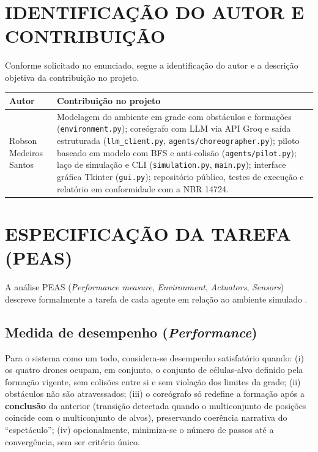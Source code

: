 \documentclass[12pt,a4paper,oneside]{article}
\begin{document}
\section{IDENTIFICAÇÃO DO AUTOR E CONTRIBUIÇÃO}

Conforme solicitado no enunciado, segue a identificação do autor e a descrição objetiva da contribuição no projeto.

\begin{table}[h]
\centering
\small
\begin{tabular}{p{4.2cm}p{9.5cm}}
\toprule
\textbf{Autor} & \textbf{Contribuição no projeto} \\
\midrule
Robson Medeiros Santos & Modelagem do ambiente em grade com obstáculos e formações (\texttt{environment.py}); coreógrafo com LLM via API Groq e saída estruturada (\texttt{llm\_client.py}, \texttt{agents/choreographer.py}); piloto baseado em modelo com BFS e anti-colisão (\texttt{agents/pilot.py}); laço de simulação e CLI (\texttt{simulation.py}, \texttt{main.py}); interface gráfica Tkinter (\texttt{gui.py}); repositório público, testes de execução e relatório em conformidade com a NBR 14724. \\
\bottomrule
\end{tabular}
\end{table}

\section{ESPECIFICAÇÃO DA TAREFA (PEAS)}

A análise PEAS (\textit{Performance measure}, \textit{Environment}, \textit{Actuators}, \textit{Sensors}) descreve formalmente a tarefa de cada agente em relação ao ambiente simulado \cite{russell2021}.

\subsection{Medida de desempenho (\textit{Performance})}

Para o sistema como um todo, considera-se desempenho satisfatório quando: (i) os quatro drones ocupam, em conjunto, o conjunto de células-alvo definido pela formação vigente, sem colisões entre si e sem violação dos limites da grade; (ii) obstáculos não são atravessados; (iii) o coreógrafo só redefine a formação após a \textbf{conclusão} da anterior (transição detectada quando o multiconjunto de posições coincide com o multiconjunto de alvos), preservando coerência narrativa do ``espetáculo''; (iv) opcionalmente, minimiza-se o número de passos até a convergência, sem ser critério único.
\end{document}
